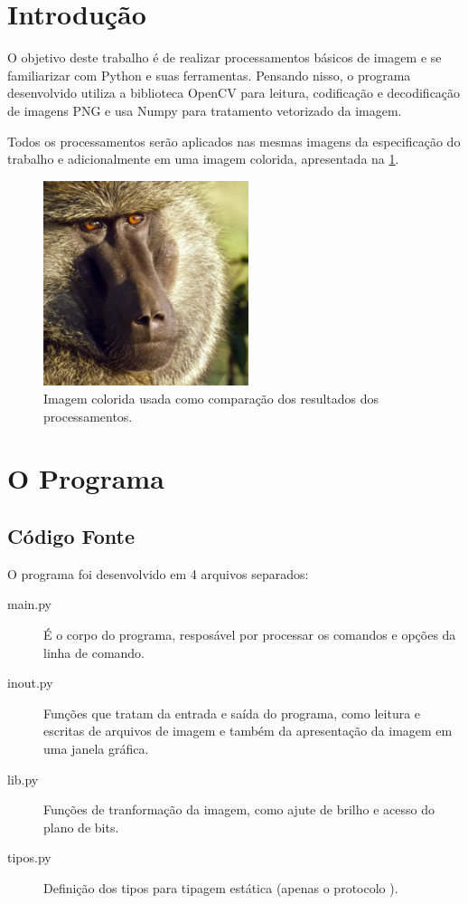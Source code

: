 \section{Introdução}

O objetivo deste trabalho é de realizar processamentos básicos de imagem e se familiarizar com Python e suas ferramentas. Pensando nisso, o programa desenvolvido utiliza a biblioteca OpenCV para leitura, codificação e decodificação de imagens PNG e usa Numpy para tratamento vetorizado da imagem.

Todos os processamentos serão aplicados nas mesmas imagens da especificação do trabalho e adicionalmente em uma imagem colorida, apresentada na \cref{fig:color}.

\begin{figure}[H]
    \centering
    \includegraphics[width=6cm]{imagens/color.png}

    \caption{Imagem colorida usada como comparação dos resultados dos processamentos.}
    \label{fig:color}
\end{figure}

\section{O Programa}

\subsection{Código Fonte}

O programa foi desenvolvido em 4 arquivos separados:

\begin{description}
    \item[main.py] É o corpo do programa, resposável por processar os comandos e opções da linha de comando.

    \item[inout.py] Funções que tratam da entrada e saída do programa, como leitura e escritas de arquivos de imagem e também da apresentação da imagem em uma janela gráfica.

    \item[lib.py] Funções de tranformação da imagem, como ajute de brilho e acesso do plano de bits.

    \item[tipos.py] Definição dos tipos para tipagem estática (apenas o protocolo \autocite{ref:pep544} ).
\end{description}

